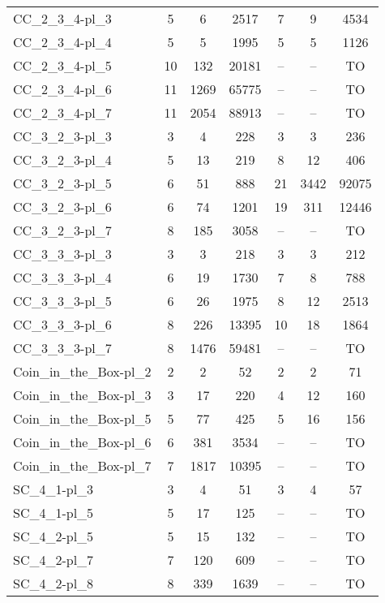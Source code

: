 \documentclass{article}
\newcommand{\unsolvedColumn}{--}
\newcommand{\myTO}{TO}
\begin{document}
\begin{longtable}[!ht]{l|ccc|ccc}
CC\_2\_3\_4-pl\_3 & 5 & 6 & 2517 & 7 & 9 & 4534 \\
CC\_2\_3\_4-pl\_4 & 5 & 5 & 1995 & 5 & 5 & 1126 \\
CC\_2\_3\_4-pl\_5 & 10 & 132 & 20181 & \unsolvedColumn & \unsolvedColumn & \myTO \\
CC\_2\_3\_4-pl\_6 & 11 & 1269 & 65775 & \unsolvedColumn & \unsolvedColumn & \myTO \\
CC\_2\_3\_4-pl\_7 & 11 & 2054 & 88913 & \unsolvedColumn & \unsolvedColumn & \myTO \\
CC\_3\_2\_3-pl\_3 & 3 & 4 & 228 & 3 & 3 & 236 \\
CC\_3\_2\_3-pl\_4 & 5 & 13 & 219 & 8 & 12 & 406 \\
CC\_3\_2\_3-pl\_5 & 6 & 51 & 888 & 21 & 3442 & 92075 \\
CC\_3\_2\_3-pl\_6 & 6 & 74 & 1201 & 19 & 311 & 12446 \\
CC\_3\_2\_3-pl\_7 & 8 & 185 & 3058 & \unsolvedColumn & \unsolvedColumn & \myTO \\
CC\_3\_3\_3-pl\_3 & 3 & 3 & 218 & 3 & 3 & 212 \\
CC\_3\_3\_3-pl\_4 & 6 & 19 & 1730 & 7 & 8 & 788 \\
CC\_3\_3\_3-pl\_5 & 6 & 26 & 1975 & 8 & 12 & 2513 \\
CC\_3\_3\_3-pl\_6 & 8 & 226 & 13395 & 10 & 18 & 1864 \\
CC\_3\_3\_3-pl\_7 & 8 & 1476 & 59481 & \unsolvedColumn & \unsolvedColumn & \myTO \\
Coin\_in\_the\_Box-pl\_2 & 2 & 2 & 52 & 2 & 2 & 71 \\
Coin\_in\_the\_Box-pl\_3 & 3 & 17 & 220 & 4 & 12 & 160 \\
Coin\_in\_the\_Box-pl\_5 & 5 & 77 & 425 & 5 & 16 & 156 \\
Coin\_in\_the\_Box-pl\_6 & 6 & 381 & 3534 & \unsolvedColumn & \unsolvedColumn & \myTO \\
Coin\_in\_the\_Box-pl\_7 & 7 & 1817 & 10395 & \unsolvedColumn & \unsolvedColumn & \myTO \\
SC\_4\_1-pl\_3 & 3 & 4 & 51 & 3 & 4 & 57 \\
SC\_4\_1-pl\_5 & 5 & 17 & 125 & \unsolvedColumn & \unsolvedColumn & \myTO \\
SC\_4\_2-pl\_5 & 5 & 15 & 132 & \unsolvedColumn & \unsolvedColumn & \myTO \\
SC\_4\_2-pl\_7 & 7 & 120 & 609 & \unsolvedColumn & \unsolvedColumn & \myTO \\
SC\_4\_2-pl\_8 & 8 & 339 & 1639 & \unsolvedColumn & \unsolvedColumn & \myTO \\

\end{longtable}
\end{document}
